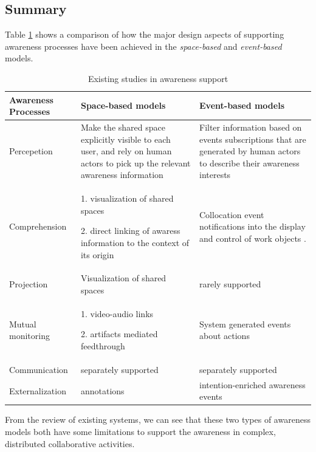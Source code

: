 \subsection{Summary} %
\label{sub:summary}
Table \ref{tab:existing_studies} shows a comparison of how the major design aspects of supporting awareness processes have been achieved in the \emph{space-based} and \emph{event-based} models.

\begin{table}[htbp]
\centering
\footnotesize
\begin{tabular}{>{\raggedright}p{1.1in}>{\raggedright}p{2.2in}>{\raggedright}p{2.2in}}

\toprule 
\textbf{Awareness Processes} & \textbf{Space-based models} & \textbf{Event-based models}\tabularnewline
\midrule 
Percepetion & Make the shared space explicitly visible to each user, and rely on
human actors to pick up the relevant awareness information  & Filter information based on events subscriptions that are generated by
human actors to describe their awareness interests\tabularnewline
\midrule 
Comprehension & 1. visualization of shared spaces

2. direct linking of awaress information to the context of its origin & Collocation event notifications into the display and control of work
objects \cite{prinz1999a,carroll2003a}.\tabularnewline
\midrule 
Projection & Visualization of shared spaces & rarely supported\tabularnewline
\midrule 
Mutual monitoring & 1. video-audio links \cite{Dourish1992}

2. artifacts mediated feedthrough \cite{Tee2009} & System generated events about actions \cite{Fuchs1995}\tabularnewline
\midrule 
Communication & separately supported & separately supported\tabularnewline
\midrule 
Externalization & annotations \cite{Zheng2006,Weng2004} & intention-enriched awareness events \cite{Rittenbruch2007}\tabularnewline
\bottomrule

\end{tabular}  
\caption{Existing studies in awareness support}
\label{tab:existing_studies}
\end{table}

From the review of existing systems, we can see that these two types of awareness models both have some limitations to support the awareness in complex, distributed collaborative activities. 


